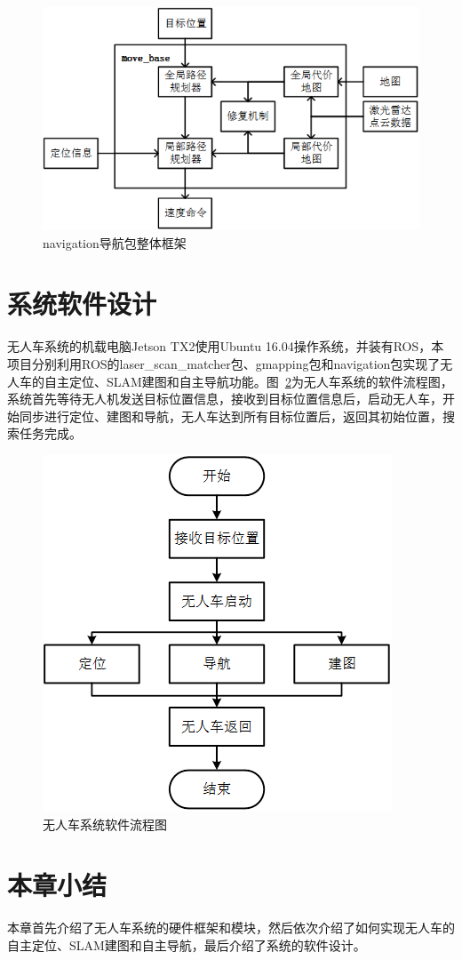 \begin{figure}[htb]
	\centering
	\includegraphics[width=\linewidth]{figures/3-10.png}
	\caption{navigation导航包整体框架}
	\label{fig:3-10}
\end{figure}

\section{系统软件设计}
无人车系统的机载电脑Jetson TX2使用Ubuntu 16.04操作系统，并装有ROS，本项目分别利用ROS的laser\_scan\_matcher包、gmapping包和navigation包实现了无人车的自主定位、SLAM建图和自主导航功能。图~\ref{fig:3-11}为无人车系统的软件流程图，系统首先等待无人机发送目标位置信息，接收到目标位置信息后，启动无人车，开始同步进行定位、建图和导航，无人车达到所有目标位置后，返回其初始位置，搜索任务完成。

\clearpage
\begin{figure}[htb]
	\centering
	\includegraphics[width=0.8\linewidth]{figures/3-11.png}
	\caption{无人车系统软件流程图}
	\label{fig:3-11}
\end{figure}

\section{本章小结}
本章首先介绍了无人车系统的硬件框架和模块，然后依次介绍了如何实现无人车的自主定位、SLAM建图和自主导航，最后介绍了系统的软件设计。


